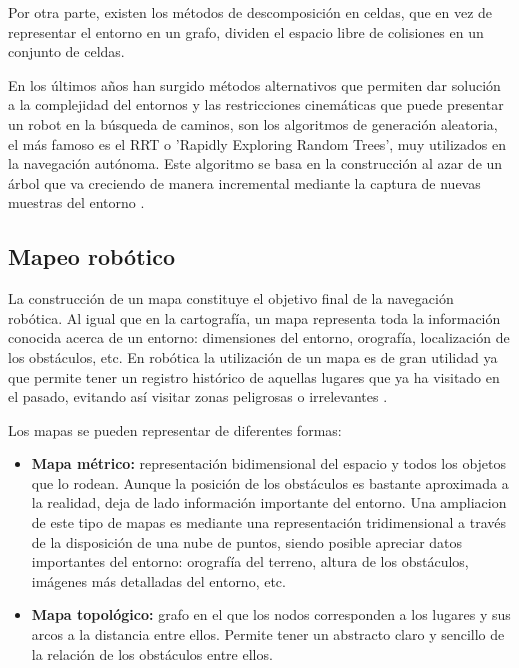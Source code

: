 Por otra parte, existen los métodos de descomposición en celdas, que en vez de
representar el entorno en un grafo, dividen el espacio libre de colisiones en un
conjunto de celdas. 

En los últimos años han surgido métodos alternativos que permiten dar solución a
la complejidad del entornos y las restricciones cinemáticas que puede presentar
un robot en la búsqueda de caminos, son los algoritmos de generación aleatoria,
el más famoso es el RRT o 'Rapidly Exploring Random Trees', muy utilizados en la
navegación autónoma. Este algoritmo se basa en la construcción al azar de un 
árbol que va creciendo de manera incremental mediante la captura de nuevas
muestras del entorno \cite{Busqueda}.

\subsection{Mapeo robótico}

La construcción de un mapa constituye el objetivo final de la navegación
robótica. Al igual que en la cartografía, un mapa representa toda la información
conocida acerca de un entorno: dimensiones del entorno, orografía, localización
de los obstáculos, etc. En robótica la utilización de un mapa es de gran
utilidad ya que permite tener un registro histórico de aquellas lugares que ya
ha visitado en el pasado, evitando así visitar zonas peligrosas o irrelevantes \cite{Mapping}.

Los mapas se pueden representar de diferentes formas:

\begin{itemize}
  \item \textbf{Mapa métrico:} representación bidimensional del espacio y todos
  los objetos que lo rodean. Aunque la posición de los obstáculos es bastante
  aproximada a la realidad, deja de lado información importante del entorno. Una
  ampliacion de este tipo de mapas es mediante una representación tridimensional
  a través de la disposición de una nube de puntos, siendo posible apreciar
  datos  importantes del entorno: orografía del terreno, altura de los
  obstáculos, imágenes más detalladas del entorno, etc.
  \item \textbf{Mapa topológico:} grafo en el que los nodos corresponden a los
  lugares y sus arcos a la distancia entre ellos. Permite tener un abstracto
  claro y sencillo de la relación de los obstáculos entre ellos.
\end{itemize}

